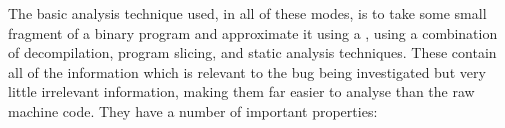 
The basic analysis technique used, in all of these modes, is to take
some small fragment of a binary program and approximate it using a
\StateMachine{},
using a combination of decompilation, program slicing, and static
analysis techniques.  These \StateMachines contain all of the
information which is relevant to the bug being investigated but very
little irrelevant information, making them far easier to analyse than
the raw machine code.  They have a number of important properties:


